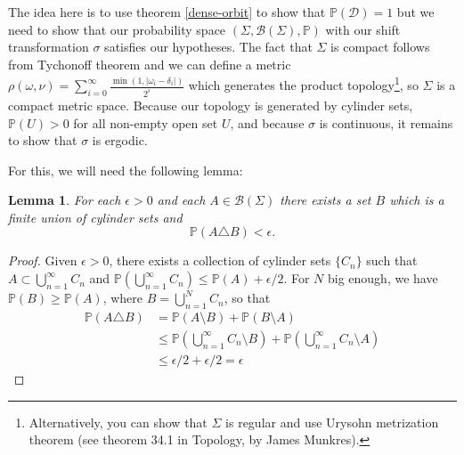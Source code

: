 \documentclass[a4paper]{article}
\theoremstyle{plain}
\newtheorem{lemma}[theorem]{Lemma}
\theoremstyle{definition}
\newcommand{\PP}{\mathbb{P}}
\begin{document}
The idea here is to use theorem \ref{dense-orbit} to show that $\PP(\mathcal D)=1$ but we need to show that our probability space $(\Sigma, \mathcal B(\Sigma), \PP)$ with our shift transformation $\sigma$ satisfies our hypotheses. The fact that $\Sigma$ is compact follows from Tychonoff theorem and we can define a metric $\rho(\omega, \nu) = \sum_{i=0}^\infty \frac{\min(1, |\omega_i-\delta_i|)}{2^i}$ which generates the product topology\footnote{Alternatively, you can show that $\Sigma$ is regular and use Urysohn metrization theorem (see theorem 34.1 in Topology, by James Munkres).}, so $\Sigma$ is a compact metric space. Because our topology is generated by cylinder sets, $\PP(U)>0$ for all non-empty open set $U$, and because $\sigma$ is continuous, it remains to show that $\sigma$ is ergodic.


For this, we will need the following lemma:
\begin{lemma}\label{cylinder-approx}
For each $\epsilon>0$ and each $A\in\mathcal B(\Sigma)$ there exists a set $B$ which is a finite union of cylinder sets and $$\PP(A\triangle B)<\epsilon.$$
\end{lemma}
\begin{proof}
    Given $\epsilon>0$, there exists  a collection of cylinder sets $\{C_n\}$ such that $A\subset \bigcup_{n=1}^\infty C_n$ and $\PP(\bigcup_{n=1}^\infty C_n)\leq \PP(A)+\epsilon/2$. For $N$ big enough, we have $\PP(B)\geq \PP(A)$, where $B=\bigcup_{n=1}^N C_n$, so that 
    \begin{align*}
        \PP(A\triangle B) &= \PP(A\setminus B)+\PP(B\setminus A)\\
        &\leq \PP(\bigcup_{n=1
}^\infty C_n\setminus B) + \PP(\bigcup_{n=1}^\infty C_n\setminus A)\\
        &\leq \epsilon/2 + \epsilon/2=\epsilon
    \end{align*}
\end{proof}
\end{document}
